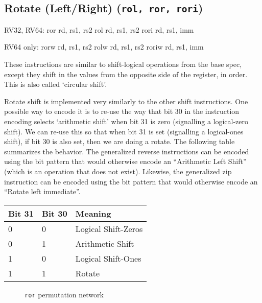 
\subsection{Rotate (Left/Right) (\texttt{rol,\ ror,\ rori})}

\begin{rvb}
  RV32, RV64:
    ror rd, rs1, rs2
    rol rd, rs1, rs2
    rori rd, rs1, imm

  RV64 only:
    rorw rd, rs1, rs2
    rolw rd, rs1, rs2
    roriw rd, rs1, imm
\end{rvb}

These instructions are similar to shift-logical operations from the base
spec, except they shift in the values from the opposite side of the
register, in order. This is also called `circular shift'.



Rotate shift is implemented very similarly to the other shift
instructions. One possible way to encode it is to re-use the way that
bit 30 in the instruction encoding selects `arithmetic shift' when bit
31 is zero (signalling a logical-zero shift). We can re-use this so that
when bit 31 is set (signalling a logical-ones shift), if bit 30 is also
set, then we are doing a rotate. The following table summarizes the
behavior. The generalized reverse instructions can be encoded using the
bit pattern that would otherwise encode an ``Arithmetic Left Shift''
(which is an operation that does not exist). Likewise, the generalized zip
instruction can be encoded using the bit pattern that would otherwise
encode an ``Rotate left immediate''.

\begin{center}
\begin{tabular}{lll}
Bit 31 & Bit 30 & Meaning \\
\hline
0 & 0 & Logical Shift-Zeros \\
0 & 1 & Arithmetic Shift \\
1 & 0 & Logical Shift-Ones \\
1 & 1 & Rotate \\
\end{tabular}
\end{center}


\begin{figure}[t]
\begin{center}

\end{center}
\caption{\texttt{ror} permutation network}
\label{permnet-ror}
\end{figure}

